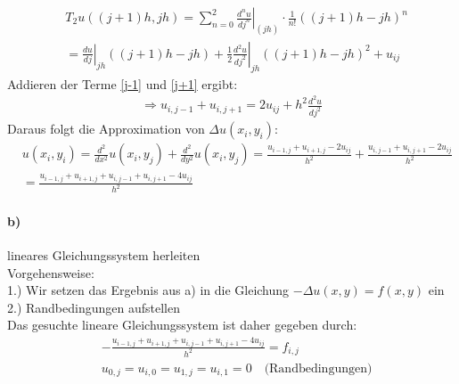 \begin{align}
&T_2 u((j+1)h, jh)=\sum_{n=0}^2 \left. \frac{d^n u}{dj^n} \right|_{(jh)} \cdot \frac{1}{n!}((j+1)h-jh)^n\\ &=\left.\frac{du}{dj}\right |_{jh} ((j+1)h-jh)+\left.\frac{1}{2}\frac{d^2u}{dj^2}\right|_{jh}((j+1)h-jh)^2+u_{ij}\label{j+1}
\end{align}
Addieren der Terme \eqref{j-1} und \eqref{j+1} ergibt:
\begin{align*}
\Rightarrow u_{i, j-1}+u_{i, j+1}=2u_{ij} + h^2 \frac{d^2u}{dj^2}
\end{align*}
Daraus folgt die Approximation von $\Delta u(x_i,y_i)$:
\begin{align*}
&u(x_i, y_i)=\frac{d^2}{dx^2}u(x_i,y_j)+\frac{d^2}{dy^2}u(x_i,y_j)=\frac{u_{i-1,j}+u_{i+1,j}-2u_{ij}}{h^2}+\frac{u_{i, j-1}+u_{i, j+1}-2u_{ij}}{h^2}\\
&=\frac{u_{i-1,j}+u_{i+1,j}+u_{i, j-1}+u_{i, j+1}-4u_{ij}}{h^2}
\end{align*} 
\paragraph*{b)}
lineares Gleichungssystem herleiten\\
\newline
Vorgehensweise:\\
1.) Wir setzen das Ergebnis aus a) in die Gleichung $-\Delta u(x,y)=f(x,y)$ ein\\
2.) Randbedingungen aufstellen\\
\newline
Das gesuchte lineare Gleichungssystem ist daher gegeben durch:
\begin{align*}
&-\frac{u_{i-1,j}+u_{i+1,j}+u_{i, j-1}+u_{i, j+1}-4u_{ij}}{h^2}=f_{i,j}\\
&u_{0,j}=u_{i,0}=u_{1,j}=u_{i,1}=0 \quad\text{(Randbedingungen)}
\end{align*}
